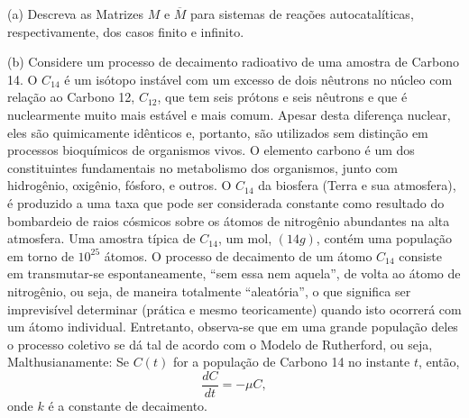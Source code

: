     \begin{exercise}
    \begin{description}
    \item (a) Descreva as Matrizes \(M\) e \(\overline{M}\) para sistemas de reações autocatalíticas, respectivamente, dos casos finito e infinito. 
    \item (b) Considere um processo de decaimento radioativo de uma amostra de Carbono 14. O \(C_{14}\) é um isótopo instável com um excesso de dois nêutrons no núcleo com relação ao Carbono 12, \(C_{12}\), que tem seis prótons e seis nêutrons e que é nuclearmente muito mais estável e mais comum. Apesar desta diferença nuclear, eles são quimicamente idênticos e, portanto, são utilizados sem distinção em processos bioquímicos de organismos vivos. O elemento carbono é um dos constituintes fundamentais no metabolismo dos organismos, junto com hidrogênio, oxigênio, fósforo, e outros. O \(C_{14}\) da biosfera (Terra e sua atmosfera), é produzido a uma taxa que pode ser considerada constante como resultado do bombardeio de raios cósmicos sobre os átomos de nitrogênio abundantes na alta atmosfera. Uma amostra típica de \(C_{14}\), um mol, \((14g)\), contém uma população em torno de \(10^{25}\) átomos. O processo de decaimento de um átomo \(C_{14}\) consiste em transmutar-se espontaneamente, ``sem essa nem aquela'', de volta ao átomo de nitrogênio, ou seja, de maneira totalmente ``aleatória'', o que significa ser imprevisível determinar (prática e mesmo teoricamente) quando isto ocorrerá com um átomo individual. Entretanto, observa-se que em uma grande população deles o processo coletivo se dá tal de acordo com o Modelo de Rutherford, ou seja, Malthusianamente: Se \(C(t)\) for a população de Carbono 14 no instante \(t\), então,
    \[\dfrac{dC}{dt} = -\mu C,\]
    onde \(k\) é a constante de decaimento.
    \end{description}
    \end{exercise}

